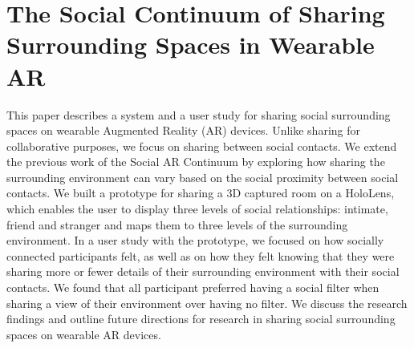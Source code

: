 \section{The Social Continuum of Sharing Surrounding Spaces in Wearable AR}


This paper describes a system and a user study for sharing social surrounding spaces on wearable Augmented Reality (AR) devices. Unlike sharing for collaborative purposes, we focus on sharing between social contacts. We extend the previous work of the Social AR Continuum by exploring how sharing the surrounding environment can vary based on the social proximity between social contacts. We built a prototype for sharing a 3D captured room on a HoloLens, which enables the user to display three levels of social relationships: intimate, friend and stranger and maps them to three levels of the surrounding environment. In a user study with the prototype, we focused on how socially connected participants felt, as well as on how they felt knowing that they were sharing more or fewer details of their surrounding environment with their social contacts. We found that all participant preferred having a social filter when sharing a view of their environment over having no filter. We discuss the research findings and outline future directions for research in sharing social surrounding spaces on wearable AR devices. 
 



